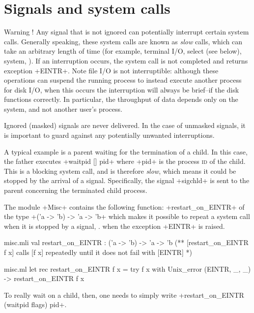 \section{Signals and system calls} 

Warning ! Any signal that is not ignored can potentially interrupt 
certain system calls.  Generally speaking, these system calls are 
known as \emph{slow} calls, which can take an arbitrary length of time (for
example, terminal I/O, select (see below), system, \etc).
If an interruption occurs, the system call is not completed and
returns exception \ml+EINTR+.  Note file I/O is not interruptible:
although these operations can suspend the running process to instead
execute another process for disk I/O, when this occurs the interruption
will always be brief--if the disk functions correctly.  In particular, 
the throughput of data depends only on the system, and not another user's
process.

Ignored (masked) signals are never delivered.  In the case of unmasked 
signals, it is important to guard against any potentially 
unwanted interruptions.

A typical example is a parent waiting for the termination of a child.
In this case, the father executes \ml+waitpid [] pid+ where \ml+pid+ 
is the process \textsc{id} of the child.  This is a blocking system call, and 
is therefore \emph{slow}, which means it could be stopped by the 
arrival of a signal.  Specifically, the signal \ml+sigchld+ is sent 
to the parent concerning the terminated child process.

The module \ml+Misc+ contains the following function:
\ml+restart_on_EINTR+ of the type \ml+('a -> 'b) -> 'a -> 'b+ which
makes it possible to repeat a system call when it is stopped
by a signal, \ie. when the exception \ml+EINTR+ is raised.

%
\begin{codefile}{misc.mli}
val restart_on_EINTR : ('a -> 'b) -> 'a -> 'b
(** [restart_on_EINTR f x] calls [f x] repeatedly until it does not fail
with [EINTR] *)
\end{codefile}
%
\begin{listingcodefile}{misc.ml}
let rec restart_on_EINTR f x = 
  try f x with Unix_error (EINTR, _, _) -> restart_on_EINTR f x
\end{listingcodefile}
\label{restart_on_EINTR}%
To really wait on a child, then, one needs to simply write
\ml+restart_on_EINTR (waitpid flags) pid+.

